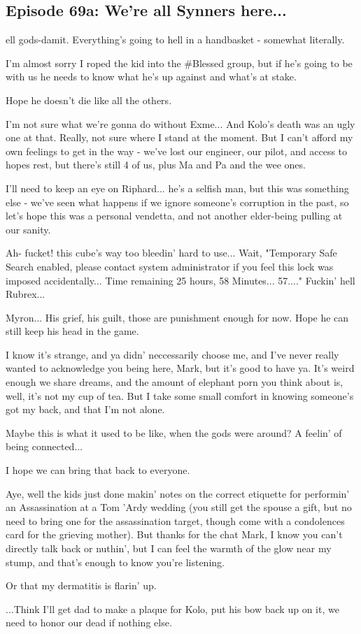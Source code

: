 \subsection{Episode 69a: We're all Synners here...}

ell gods-damit. Everything's going to hell in a handbasket - somewhat literally.\medskip

I'm almost sorry I roped the kid into the \#Blessed group, but if he's going to be with us he needs to know what he's up against and what's at stake.\medskip

Hope he doesn't die like all the others.\medskip

I'm not sure what we're gonna do without Exme... And Kolo's death was an ugly one at that. Really, not sure where I stand at the moment. But I can't afford my own feelings to get in the way - we've lost our engineer, our pilot, and access to hopes rest, but there's still 4 of us, plus Ma and Pa and the wee ones.\medskip

I'll need to keep an eye on Riphard... he's a selfish man, but this was something else - we've seen what happens if we ignore someone's corruption in the past, so let's hope this was a personal vendetta, and not another elder-being pulling at our sanity.\medskip

Ah- fucket! this cube's way too bleedin' hard to use... Wait, "Temporary Safe Search enabled, please contact system administrator if you feel this lock was imposed accidentally... Time remaining 25 hours, 58 Minutes... 57...." Fuckin' hell Rubrex...\medskip

Myron... His grief, his guilt, those are punishment enough for now. Hope he can still keep his head in the game.\medskip

I know it's strange, and ya didn' neccessarily choose me, and I've never really wanted to acknowledge you being here, Mark, but it's good to have ya. It's weird enough we share dreams, and the amount of elephant porn you think about is, well, it's not my cup of tea. But I take some small comfort in knowing someone's got my back, and that I'm not alone.\medskip

Maybe this is what it used to be like, when the gods were around? A feelin' of being connected...\medskip

I hope we can bring that back to everyone.\medskip

Aye, well the kids just done makin' notes on the correct etiquette for performin' an Assassination at a Tom 'Ardy wedding (you still get the spouse a gift, but no need to bring one for the assassination target, though come with a condolences card for the grieving mother). But thanks for the chat Mark, I know you can't directly talk back or nuthin', but I can feel the warmth of the glow near my stump, and that's enough to know you're listening.\medskip

Or that my dermatitis is flarin' up.\medskip

...Think I'll get dad to make a plaque for Kolo, put his bow back up on it, we need to honor our dead if nothing else.\medskip

\vspace*{5mm}
